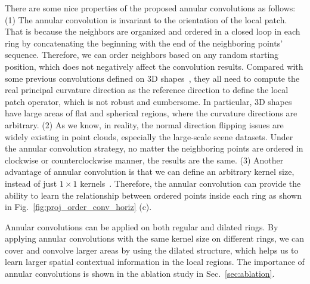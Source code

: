 \documentclass[10pt,twocolumn,letterpaper]{article}
\begin{document}
There are some nice properties of the proposed annular convolutions as follows: (1) The annular convolution is invariant to the orientation of the local patch. That is because the neighbors are organized and ordered in a closed loop in each ring by concatenating the beginning with the end of the neighboring points' sequence. Therefore, we can order neighbors based on any random starting position, which does not negatively affect the convolution results. Compared with some previous convolutions defined on 3D shapes~\cite{boscaini2016learning,Xu_2017_ICCV,tatarchenko2018tangent}, they all need to compute the real principal curvature direction as the reference direction to define the local patch operator, which is not robust and cumbersome. In particular, 3D shapes have large areas of flat and spherical regions, where the curvature directions are arbitrary. (2) As we know, in reality, the normal direction flipping issues are widely existing in point clouds, especially the large-scale scene datasets. Under the annular convolution strategy, no matter the neighboring points are ordered in clockwise or counterclockwise manner, the results are the same. (3) Another advantage of annular convolution is that we can define an arbitrary kernel size, instead of just $1\times1$ kernels~\cite{qi2017pointnet,qi2017pointnet++}. Therefore, the annular convolution can provide the ability to learn the relationship between ordered points inside each ring as shown in Fig.~\ref{fig:proj_order_conv_horiz} (c).

Annular convolutions can be applied on both regular and dilated rings. By applying annular convolutions with the same kernel size on different rings, we can cover and convolve larger areas by using the dilated structure, which helps us to learn larger spatial contextual information in the local regions. The importance of annular convolutions is shown in the ablation study in Sec.~\ref{sec:ablation}.
\vspace{-2mm}
\end{document}
